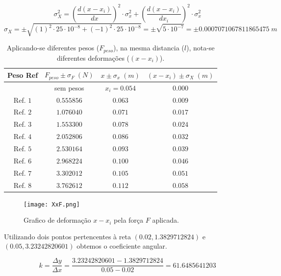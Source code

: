 \documentclass{article}
\begin{document}
\[\sigma_X^2 = \left(\frac{d(x-x_i)}{dx}\right)^2\cdot\sigma_x^2 + \left(\frac{d(x-x_i)}{dx_i}\right)^2\cdot\sigma_x^2\]
\[\sigma_X = \pm\sqrt{(1)^2\cdot25\cdot10^{-8} + (-1)^2\cdot25\cdot10^{-8}} = \pm\sqrt{5\cdot10^{-7}} = \pm0.0007071067811865475\;m\]

\begin{table}[!ht]
    \centering
    \caption{Aplicando-se diferentes pesos ($F_{peso}$), na mesma distancia ($l$), nota-se diferentes deformações ($(x - x_i)$).}
    \label{tab:p1}
    \begin{tabular}{c c|c|c}
        Peso Ref & $F_{peso}\pm\sigma_F\;(N)$ & $x\pm\sigma_x\;(m)$ & $(x - x_i)\pm\sigma_X\;(m)$\\
        \hline
        & sem pesos & $x_i = 0.054$ & $0.000$\\
        Ref. $1$ & $0.555856$ & $0.063$ & $0.009$\\
        Ref. $2$ & $1.076040$ & $0.071$ & $0.017$\\
        Ref. $3$ & $1.553300$ & $0.078$ & $0.024$\\
        Ref. $4$ & $2.052806$ & $0.086$ & $0.032$\\
        Ref. $5$ & $2.530164$ & $0.093$ & $0.039$\\
        Ref. $6$ & $2.968224$ & $0.100$ & $0.046$\\
        Ref. $7$ & $3.302012$ & $0.105$ & $0.051$\\
        Ref. $8$ & $3.762612$ & $0.112$ & $0.058$\\
    \end{tabular}
\end{table}


\begin{figure}[!ht]
    \centering
     \caption{Grafico de deformação $x - x_i$ pela força $F$ aplicada.}
    \label{gra:XxF}
    \texttt{[image: XxF.png]}
\end{figure}

Utilizando dois pontos pertencentes à reta $(0.02, 1.3829712824)$ e $(0.05, 3.23242820601)$ obtemos o coeficiente angular.



\[k = \frac{\Delta y}{\Delta x} = \frac{3.23242820601-1.3829712824}{0.05-0.02} = 61.6485641203\]
\end{document}
